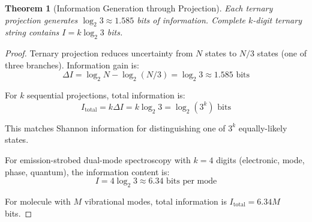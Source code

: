 \documentclass[twocolumn,10pt]{article}
\newtheorem{theorem}{Theorem}[section]
\begin{document}
\begin{theorem}[Information Generation through Projection]
\label{thm:information_generation}
Each ternary projection generates $\log_2 3 \approx 1.585$ bits of information. Complete $k$-digit ternary string contains $I = k \log_2 3$ bits.
\end{theorem}

\begin{proof}
Ternary projection reduces uncertainty from $N$ states to $N/3$ states (one of three branches). Information gain is:
\begin{equation}
\Delta I = \log_2 N - \log_2(N/3) = \log_2 3 \approx 1.585 \text{ bits}
\end{equation}

For $k$ sequential projections, total information is:
\begin{equation}
I_{\text{total}} = k \Delta I = k \log_2 3 = \log_2(3^k) \text{ bits}
\end{equation}

This matches Shannon information for distinguishing one of $3^k$ equally-likely states.

For emission-strobed dual-mode spectroscopy with $k=4$ digits (electronic, mode, phase, quantum), the information content is:
\begin{equation}
I = 4 \log_2 3 \approx 6.34 \text{ bits per mode}
\end{equation}

For molecule with $M$ vibrational modes, total information is $I_{\text{total}} = 6.34M$ bits.
\end{proof}
\end{document}
